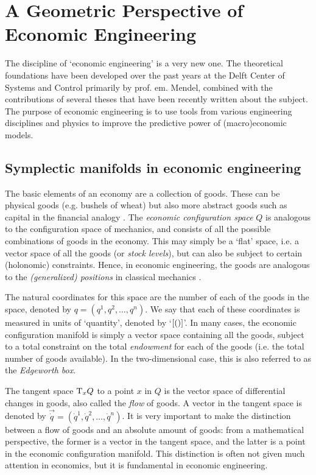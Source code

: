 \chapter{A Geometric Perspective of Economic Engineering}
\label{chap:symplectic_economics}

The discipline of `economic engineering' is a very new one. The theoretical foundations have been developed over the past years at the Delft Center of Systems and Control primarily by prof. em. Mendel, combined with the contributions of several theses that have been recently written about the subject. The purpose of economic engineering is to use tools from various engineering disciplines and physics to improve the predictive power of (macro)economic models.

\section{Symplectic manifolds in economic engineering}
The basic elements of an economy are a collection of goods. These can be physical goods (e.g. bushels of wheat) but also more abstract goods such as capital in the financial analogy \cite{Kruimer2021}. The \emph{economic configuration space} \(Q\) is analogous to the configuration space of mechanics, and consists of all the possible combinations of goods in the economy. This may simply be a `flat' space, i.e. a vector space of all the goods (or \emph{stock levels}), but can also be subject to certain (holonomic) constraints. Hence, in economic engineering, the goods are analogous to the \emph{(generalized) positions} in classical mechanics \cite{Mendel2019}. 

The natural coordinates for this space are the number of each of the goods in the space, denoted by \(q = (q^1, q^2, \ldots, q^n)\). We say that each of these coordinates is measured in units of `quantity', denoted by `\(\qty[\si{\quantity}]\)'. In many cases, the economic configuration manifold is simply a vector space containing all the goods, subject to a total constraint on the total \emph{endowment} for each of the goods (i.e. the total number of goods available). In the two-dimensional case, this is also referred to as the \emph{Edgeworth box}.

The tangent space \(\mathrm{T}_{x} Q\) to a point \(x\) in \(Q\) is the vector space of differential changes in goods, also called the \emph{flow} of goods. A vector in the tangent space is denoted by \(\vec{\dot{q}} = (\dot{q}^1, \dot{q}^2, \ldots, \dot{q}^n)\). It is very important to make the distinction between a flow of goods and an absolute amount of goods: from a mathematical perspective, the former is a vector in the tangent space, and the latter is a point in the economic configuration manifold. This distinction is often not given much attention in economics, but it is fundamental in economic engineering.

